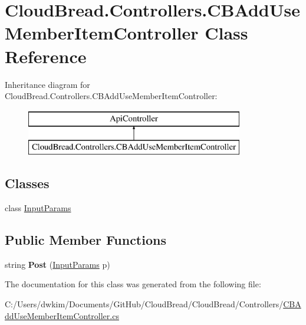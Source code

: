 \hypertarget{class_cloud_bread_1_1_controllers_1_1_c_b_add_use_member_item_controller}{}\section{Cloud\+Bread.\+Controllers.\+C\+B\+Add\+Use\+Member\+Item\+Controller Class Reference}
\label{class_cloud_bread_1_1_controllers_1_1_c_b_add_use_member_item_controller}
Inheritance diagram for Cloud\+Bread.\+Controllers.\+C\+B\+Add\+Use\+Member\+Item\+Controller\+:\begin{figure}[H]
\begin{center}
\leavevmode
\includegraphics[height=2.000000cm]{class_cloud_bread_1_1_controllers_1_1_c_b_add_use_member_item_controller}
\end{center}
\end{figure}
\subsection*{Classes}
\begin{DoxyCompactItemize}
\item 
class \hyperlink{class_cloud_bread_1_1_controllers_1_1_c_b_add_use_member_item_controller_1_1_input_params}{Input\+Params}
\end{DoxyCompactItemize}
\subsection*{Public Member Functions}
\begin{DoxyCompactItemize}
\item 
string {\bfseries Post} (\hyperlink{class_cloud_bread_1_1_controllers_1_1_c_b_add_use_member_item_controller_1_1_input_params}{Input\+Params} p)\hypertarget{class_cloud_bread_1_1_controllers_1_1_c_b_add_use_member_item_controller_aa1e7d18f4f7835c2f6c81d1972d1481a}{}\label{class_cloud_bread_1_1_controllers_1_1_c_b_add_use_member_item_controller_aa1e7d18f4f7835c2f6c81d1972d1481a}

\end{DoxyCompactItemize}


The documentation for this class was generated from the following file\+:\begin{DoxyCompactItemize}
\item 
C\+:/\+Users/dwkim/\+Documents/\+Git\+Hub/\+Cloud\+Bread/\+Cloud\+Bread/\+Controllers/\hyperlink{_c_b_add_use_member_item_controller_8cs}{C\+B\+Add\+Use\+Member\+Item\+Controller.\+cs}\end{DoxyCompactItemize}
